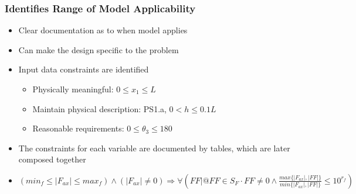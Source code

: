 \documentclass[t,12pt,numbers,fleqn]{beamer}
\begin{document}

\begin{frame}
\frametitle{Identifies Range of Model Applicability}
\begin{itemize}
\item Clear documentation as to when model applies
\item Can make the design specific to the problem
\item Input data constraints are identified
\begin{itemize}
\item Physically meaningful: $0 \leq x_1 \leq L$
\item Maintain physical description: PS1.a, $0 < h \leq 0.1 L$
\item Reasonable requirements: $0 \leq \theta_3 \leq 180$
\end{itemize}
\item The constraints for each variable are documented by tables, which are later composed together
\item $(min_f \le |F_{ax}| \le max_f) 
\land (|F_{ax}| \ne 0) \Rightarrow \forall ({FF}|{@{FF} \in S_F} \cdot {FF \ne 0
\land  \frac{max\{{|F_{ax}|,|FF|}\}}{min\{{|F_{ax}|, |FF|}\}} \le 10 ^ {r_f}})$
\end{itemize}
\end{frame}
\end{document}
